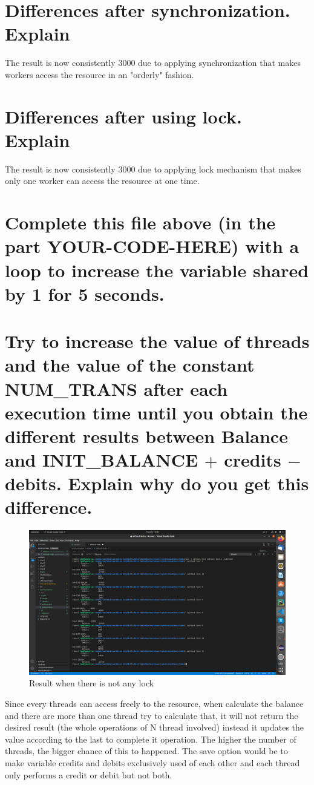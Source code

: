 \documentclass[11pt,a4paper]{report}
\begin{document}
\section{Differences after synchronization. Explain}
The result is now consistently 3000 due to applying synchronization that makes workers access the resource in an "orderly" fashion.
\section{Differences after using lock. Explain}
The result is now consistently 3000 due to applying lock mechanism that makes only one worker can access the resource at one time.
\section{Complete this file above (in the part YOUR-CODE-HERE) with a loop to increase the variable shared by 1 for 5 seconds.}

\section{Try to increase the value of threads and the value of the constant NUM\_TRANS after each execution time until you obtain the different results between Balance and INIT\_BALANCE $+$ credits $-$ debits. Explain why do you get this difference.}
\begin{figure}[h!]
	\centering
  	\includegraphics[width=\linewidth]{without-lock.png}
  	\caption{Result when there is not any lock}
  	\label{fig:wolock}
\end{figure}
Since every threads can access freely to the resource, when calculate the balance and there are more than one thread try to calculate that, it will not return the desired result (the whole operations of N thread involved) instead it updates the value according to the last to complete it operation. The higher the number of threads, the bigger chance of this to happened. The save option would be to make variable credits and debits exclusively used of each other and each thread only performs a credit or debit but not both.
\end{document}
